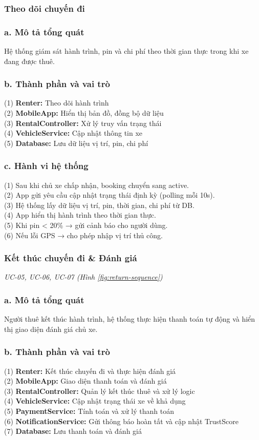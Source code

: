 \subsubsection{Theo dõi chuyến đi}
\subsubsection*{a. Mô tả tổng quát}
Hệ thống giám sát hành trình, pin và chi phí theo thời gian thực trong khi xe đang được thuê.
\subsubsection*{b. Thành phần và vai trò}
(1) \textbf{Renter:} Theo dõi hành trình \\
(2) \textbf{MobileApp:} Hiển thị bản đồ, đồng bộ dữ liệu \\
(3) \textbf{RentalController:} Xử lý truy vấn trạng thái \\
(4) \textbf{VehicleService:} Cập nhật thông tin xe \\
(5) \textbf{Database:} Lưu dữ liệu vị trí, pin, chi phí
\subsubsection*{c. Hành vi hệ thống}
(1) Sau khi chủ xe chấp nhận, booking chuyển sang active. \\
(2) App gửi yêu cầu cập nhật trạng thái định kỳ (polling mỗi 10s). \\
(3) Hệ thống lấy dữ liệu vị trí, pin, thời gian, chi phí từ DB. \\
(4) App hiển thị hành trình theo thời gian thực. \\
(5) Khi pin < 20\% → gửi cảnh báo cho người dùng. \\
(6) Nếu lỗi GPS → cho phép nhập vị trí thủ công.
\subsubsection{Kết thúc chuyến đi \& Đánh giá}
\small\textit{UC-05, UC-06, UC-07 (Hình \ref{fig:return-sequence})}
\subsubsection*{a. Mô tả tổng quát}
Người thuê kết thúc hành trình, hệ thống thực hiện thanh toán tự động và hiển thị giao diện đánh giá chủ xe.
\subsubsection*{b. Thành phần và vai trò}
(1) \textbf{Renter:} Kết thúc chuyến đi và thực hiện đánh giá \\
(2) \textbf{MobileApp:} Giao diện thanh toán và đánh giá \\
(3) \textbf{RentalController:} Quản lý kết thúc thuê và xử lý logic \\
(4) \textbf{VehicleService:} Cập nhật trạng thái xe về khả dụng \\
(5) \textbf{PaymentService:} Tính toán và xử lý thanh toán \\
(6) \textbf{NotificationService:} Gửi thông báo hoàn tất và cập nhật TrustScore \\
(7) \textbf{Database:} Lưu thanh toán và đánh giá
